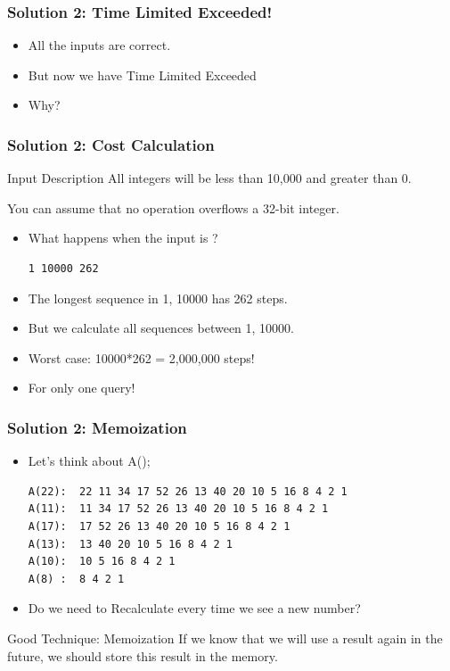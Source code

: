 \begin{frame}
  \frametitle{Solution 2: Time Limited Exceeded!}
  \begin{itemize}
    \item All the inputs are correct.
    \bigskip

    \item But now we have \alert{Time Limited Exceeded}
    \bigskip

    \item Why?
  \end{itemize}
\end{frame}

\begin{frame}[fragile]
  \frametitle{Solution 2: Cost Calculation}

    \begin{block}{Input Description}
    All integers will be \alert{less than 10,000 and greater than 0.}
    \bigskip

    You can \alert{assume that no operation overflows a 32-bit integer}.
    \end{block}
    \bigskip

    \begin{itemize}
      \item What happens when the input is ?
\begin{verbatim}
1 10000 262
\end{verbatim}
      \bigskip

      \item The longest sequence in 1, 10000 has 262 steps.
      \item But we calculate \alert{all} sequences between 1, 10000.
      \item Worst case: 10000*262 = 2,000,000 steps!
      \bigskip

      \item For only one query!
    \end{itemize}
\end{frame}

\begin{frame}[fragile]
  \frametitle{Solution 2: Memoization}

  \begin{itemize}
    \item Let's think about A();
\begin{verbatim}
A(22):  22 11 34 17 52 26 13 40 20 10 5 16 8 4 2 1
A(11):  11 34 17 52 26 13 40 20 10 5 16 8 4 2 1
A(17):  17 52 26 13 40 20 10 5 16 8 4 2 1
A(13):  13 40 20 10 5 16 8 4 2 1
A(10):  10 5 16 8 4 2 1
A(8) :  8 4 2 1
\end{verbatim}
    \bigskip

    \item Do we need to \alert{Recalculate} every time we see a new number?
  \end{itemize}

  \begin{block}{Good Technique: Memoization}
    If we know that we will use a result again in the future,
    we should \alert{store this result in the memory}.
  \end{block}
\end{frame}

